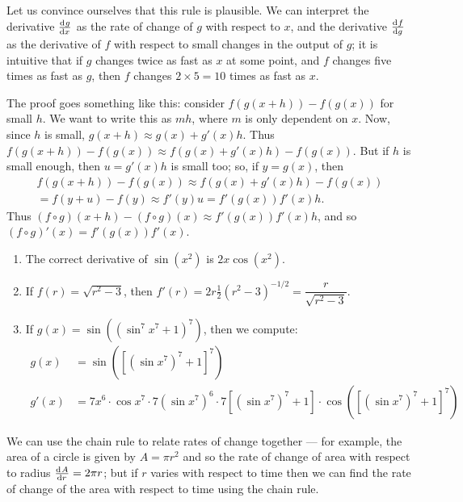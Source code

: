 Let us convince ourselves that this rule is plausible. We can interpret the derivative $ \od{g}{x} $ as the rate of change
of $ g $ with respect to $ x $, and the derivative $ \od{f}{g} $ as the derivative of $ f $ with respect to small changes in
the output of $ g $; it is intuitive that if $ g $ changes twice as fast as $ x $ at some point, and $ f $ changes five
times as fast as $ g $, then $ f $ changes $ 2 \times 5 = 10 $ times as fast as $ x $.

The proof goes something like this: consider $ f(g(x + h)) - f(g(x)) $ for small $ h $. We want to write this as $ m h $, where $ m $
is only dependent on $ x $. Now, since $ h $ is small, $ g(x + h) \approx g(x) + g'(x)h $. Thus $ f(g(x + h)) - f(g(x)) \approx f(g(x) + g'(x)h) - f(g(x)) $.
But if $ h $ is small enough, then $ u = g'(x) h $ is small too; so, if $ y = g(x) $, then
\begin{multline*}
  f(g(x + h)) - f(g(x)) \approx f(g(x) + g'(x)h) - f(g(x))\\
    = f(y + u) - f(y) \approx f'(y)u = f'(g(x)) f'(x)h.
\end{multline*}
Thus $ (f \circ g)(x + h) - (f \circ g)(x) \approx f'(g(x)) f'(x) h $, and so $ (f \circ g)'(x) = f'(g(x)) f'(x) $.

\begin{exs}\leavevmode
  \begin{enumerate}
    \item The correct derivative of $ \sin(x^2) $ is $ 2x \cos(x^2) $.
    \item If $ f(r) = \sqrt{r^2 - 3} $, then $ f'(r) = 2r \frac{1}{2} \left(r^2 - 3\right)^{-1/2} = \dfrac{r}{\sqrt{r^2 - 3}} $.
    \item If $ g(x) = \sin((\sin^7 x^7 + 1)^7) $, then we compute:
          \begin{align*}
            g(x)  &= \sin \left( \left[ \left( \sin x^7 \right)^7 + 1 \right]^7 \right)\\
            g'(x) &= 7x^6 \cdot \cos x^7 \cdot 7\left(\sin x^7\right)^6 \cdot 7\left[\left(\sin x^7\right)^7 + 1\right]
                          \cdot \cos \left( \left[ \left( \sin x^7 \right)^7 + 1 \right]^7 \right)
          \end{align*}
  \end{enumerate}
\end{exs}

We can use the chain rule to relate rates of change together --- for example, the area of a circle is given by $ A = \pi r^2 $
and so the rate of change of area with respect to radius $ \od{A}{r} = 2\pi r $; but if $ r $ varies with respect to time then
we can find the rate of change of the area with respect to time using the chain rule.

